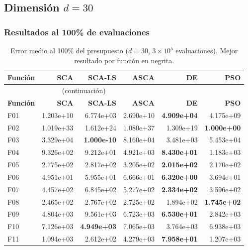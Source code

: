 \documentclass[12pt,a4paper]{article}
\begin{document}
\subsection{Dimensión $d = 30$}
 
\subsubsection{Resultados al 100\% de evaluaciones}
 
 
\begin{longtable}{lrrrrr}
\caption{Error medio al 100\% del presupuesto ($d=30$, $3\times10^5$ evaluaciones). Mejor resultado por función en negrita.}
\label{tab:resultados_sca_ls_d30}\\
\toprule
\textbf{Función} & \textbf{SCA} & \textbf{SCA-LS} & \textbf{ASCA} & \textbf{DE} & \textbf{PSO} \\
\midrule
\endfirsthead
\multicolumn{4}{c}{\tablename~\thetable{} (continuación)}\\
\toprule
\textbf{Función} & \textbf{SCA} & \textbf{SCA-LS} & \textbf{ASCA} & \textbf{DE} & \textbf{PSO} \\
\midrule
\endhead
\midrule
\endfoot
\bottomrule
\endlastfoot
F01  & 1.203e+10 & 6.774e+03 & 2.690e+10 & \textbf{4.909e+04} & 4.175e+09 \\
F02  & 1.019e+33 & 1.612e+24 & 1.080e+37 & 1.309e+19 & \textbf{1.000e+00} \\
F03  & 3.329e+04 & \textbf{1.000e-10} & 8.160e+04 & 3.481e+03 & 5.453e+04 \\
F04  & 9.326e+02 & 9.212e+01 & 4.921e+03 & \textbf{8.430e+01} & 1.183e+03 \\
F05  & 2.775e+02 & 2.817e+02 & 3.205e+02 & \textbf{2.015e+02} & 2.170e+02 \\
F06  & 4.951e+01 & 5.955e+01 & 6.666e+01 & \textbf{6.320e+00} & 3.694e+01 \\
F07  & 4.457e+02 & 6.845e+02 & 5.277e+02 & \textbf{2.334e+02} & 3.596e+02 \\
F08  & 2.465e+02 & 2.767e+02 & 2.725e+02 & 1.894e+02 & \textbf{1.745e+02} \\
F09  & 4.804e+03 & 9.561e+03 & 6.723e+03 & \textbf{6.530e+01} & 2.842e+03 \\
F10  & 7.126e+03 & \textbf{4.949e+03} & 7.065e+03 & 3.764e+03 & 6.938e+03 \\
F11  & 1.094e+03 & 2.612e+02 & 4.279e+03 & \textbf{7.958e+01} & 1.207e+03 \\

\end{longtable}
\end{document}
